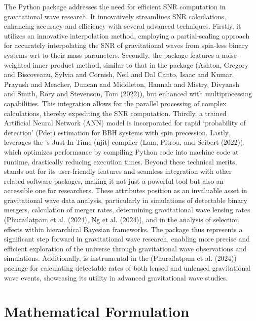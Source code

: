 \documentclass[10pt,a4paper,onecolumn]{article}
\let\textttOrig=\texttt
\def\texttt#1{\expandafter\textttOrig{\seqsplit{#1}}}
\begin{document}
The \emph{\texttt{gwsnr}} Python package addresses the need for
efficient SNR computation in gravitational wave research. It
innovatively streamlines SNR calculations, enhancing accuracy and
efficiency with several advanced techniques. Firstly, it utilizes an
innovative interpolation method, employing a partial-scaling approach
for accurately interpolating the SNR of gravitational waves from
spin-less binary systems wrt to their mass parameters. Secondly, the
package features a noise-weighted inner product method, similar to that
in the \emph{\texttt{bilby}} package (Ashton, Gregory and Biscoveanu,
Sylvia and Cornish, Neil and Dal Canto, Isaac and Kumar, Prayush and
Meacher, Duncan and Middleton, Hannah and Mistry, Divyansh and Smith,
Rory and Stevenson, Tom (2022)), but enhanced with multiprocessing
capabilities. This integration allows for the parallel processing of
complex calculations, thereby expediting the SNR computation. Thirdly, a
trained Artificial Neural Network (ANN) model is incorporated for rapid
`probability of detection' (Pdet) estimation for BBH systems with spin
precession. Lastly, \emph{\texttt{gwsnr}} leverages the
\emph{\texttt{numba}}'s Just-In-Time (njit) compiler (Lam, Pitrou, and
Seibert (2022)), which optimizes performance by compiling Python code
into machine code at runtime, drastically reducing execution times.
Beyond these technical merits, \emph{\texttt{gwsnr}} stands out for its
user-friendly features and seamless integration with other related
software packages, making it not just a powerful tool but also an
accessible one for researchers. These attributes position
\emph{\texttt{gwsnr}} as an invaluable asset in gravitational wave data
analysis, particularly in simulations of detectable binary mergers,
calculation of merger rates, determining gravitational wave lensing
rates (Phurailatpam et al. (2024), Ng et al. (2024)), and in the
analysis of selection effects within hierarchical Bayesian frameworks.
The package thus represents a significant step forward in gravitational
wave research, enabling more precise and efficient exploration of the
universe through gravitational wave observations and simulations.
Additionally, \emph{\texttt{gwsnr}} is instrumental in the
\emph{\texttt{ler}} (Phurailatpam et al. (2024)) package for calculating
detectable rates of both lensed and unlensed gravitational wave events,
showcasing its utility in advanced gravitational wave studies.

\section{Mathematical Formulation}\label{mathematical-formulation}
\end{document}
